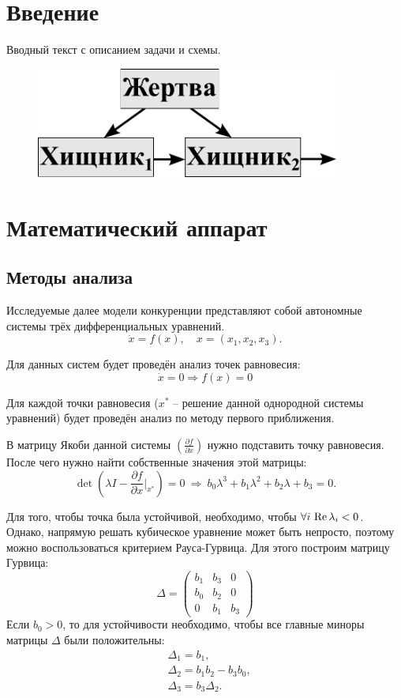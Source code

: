 \section{Введение}
    Вводный текст с описанием задачи и схемы.
    \begin{figure}[H]
        \centering
        \includegraphics[width=10cm]{pictures/scheme.pdf}
    \end{figure}


\pagebreak

\section{Математический аппарат}
    \subsection{Методы анализа}
    Исследуемые далее модели конкуренции представляют собой автономные системы трёх дифференциальных уравнений.
    \[
        \dot{x} = f(x), \quad x = (x_1, x_2, x_3).
    \]

    Для данных систем будет проведён анализ точек равновесия:
    \[
        \dot{x} = 0 \Rightarrow f(x) = 0
    \]

    Для каждой точки равновесия (\( x^* \) -- решение данной однородной системы уравнений) будет проведён анализ по методу первого приближения\cite{filipov}.

    В матрицу Якоби данной системы \( \left( \frac{\partial f}{\partial x} \right) \) нужно подставить точку равновесия. После чего нужно найти собственные значения этой матрицы:
    \[
        \det \left( \lambda I - \frac{\partial f}{\partial x}\big|_{x^*} \right) = 0 ~ \Rightarrow ~ b_0 \lambda^3 + b_1 \lambda^2 + b_2 \lambda + b_3 = 0.
    \]

    Для того, чтобы точка была устойчивой, необходимо, чтобы \( \forall i \, \operatorname{Re} \lambda_i < 0 \). Однако, напрямую решать кубическое уравнение может быть непросто, поэтому можно воспользоваться критерием Рауса-Гурвица\cite{nefedov}. Для этого построим матрицу Гурвица: 
    \[
        \Delta = \left( \begin{matrix}
            b_1 & b_3 & 0 \\
            b_0 & b_2 & 0 \\
            0   & b_1 & b_3
        \end{matrix} \right)
    \]
    Если \( b_0 > 0\), то для устойчивости необходимо, чтобы все главные миноры матрицы \( \Delta \) были положительны:
    \[
        \begin{split}
            & \Delta_1 = b_1, \\
            & \Delta_2 = b_1 b_2 - b_3 b_0, \\
            & \Delta_3 = b_3 \Delta_2.
        \end{split}
    \]

